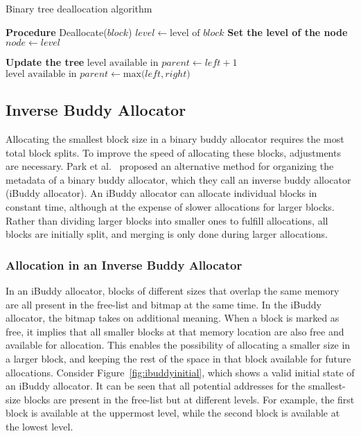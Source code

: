 \begin{algorithm}
  \caption{Binary tree deallocation algorithm}
  \label{alg:btbuddy_dealloc}
  \begin{algorithmic}[1]
    \Statex \textbf{Procedure} Deallocate($block$)
    \State $level \gets \text{level of } block$
    \Statex \textbf{Set the level of the node}
    \State $node \gets level$

    \Statex \textbf{Update the tree}
    \State $\text{level available in } parent \gets left + 1$
    \Else
    \State $\text{level available in } parent \gets \text{max(}left,right\text{)}$
    \EndIf
    \EndFor
  \end{algorithmic}
\end{algorithm}

\subsection{Inverse Buddy Allocator}
Allocating the smallest block size in a binary buddy allocator requires the most total block splits. To improve the speed of allocating these blocks, adjustments are necessary. Park et al.~\cite{park2014ibuddy} proposed an alternative method for organizing the metadata of a binary buddy allocator, which they call an inverse buddy allocator (iBuddy allocator). An iBuddy allocator can allocate individual blocks in constant time, although at the expense of slower allocations for larger blocks. Rather than dividing larger blocks into smaller ones to fulfill allocations, all blocks are initially split, and merging is only done during larger allocations.

\subsubsection{Allocation in an Inverse Buddy Allocator}
In an iBuddy allocator, blocks of different sizes that overlap the same memory are all present in the free-list and bitmap at the same time. In the iBuddy allocator, the bitmap takes on additional meaning. When a block is marked as free, it implies that all smaller blocks at that memory location are also free and available for allocation. This enables the possibility of allocating a smaller size in a larger block, and keeping the rest of the space in that block available for future allocations. Consider Figure~\ref{fig:ibuddyinitial}, which shows a valid initial state of an iBuddy allocator. It can be seen that all potential addresses for the smallest-size blocks are present in the free-list but at different levels. For example, the first block is available at the uppermost level, while the second block is available at the lowest level.

